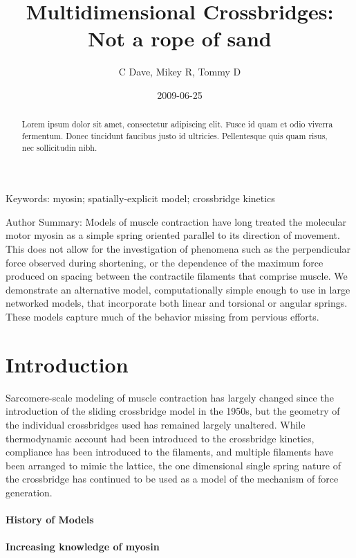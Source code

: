 \documentclass[]{article}
\title{Multidimensional Crossbridges: Not a rope of sand}
\author{C Dave, Mikey R, Tommy D}
\date{2009-06-25}
\begin{document}
\maketitle

 
\begin{abstract}
	Lorem ipsum dolor sit amet, consectetur adipiscing elit. Fusce id quam et odio viverra fermentum. Donec tincidunt faucibus justo id ultricies. Pellentesque quis quam risus, nec sollicitudin nibh. 
\end{abstract}

Keywords: myosin; spatially-explicit model; crossbridge kinetics

Author Summary: 
	Models of muscle contraction have long treated the molecular motor myosin as a simple spring oriented parallel to its direction of movement. This does not allow for the investigation of phenomena such as the perpendicular force observed during shortening, or the dependence of the maximum force produced on spacing between the contractile filaments that comprise muscle. We demonstrate an alternative model, computationally simple enough to use in large networked models, that incorporate both linear and torsional or angular springs. These models capture much of the behavior missing from pervious efforts.

\section{Introduction}
	Sarcomere-scale modeling of muscle contraction has largely changed since the introduction of the sliding crossbridge model in the 1950s, but the geometry of the individual crossbridges used has remained largely unaltered. While thermodynamic account had been introduced to the crossbridge kinetics, compliance has been introduced to the filaments, and multiple filaments have been arranged to mimic the lattice, the one dimensional single spring nature of the crossbridge has continued to be used as a model of the mechanism of force generation.

	\paragraph*{History of Models}


\paragraph*{Increasing knowledge of myosin}
\end{document}
